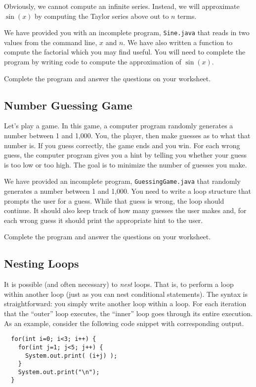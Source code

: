 \documentclass[12pt]{scrartcl}
\begin{document}
Obviously, we cannot compute an infinite series.  Instead, we will 
approximate $\sin(x)$ by computing the Taylor series above out to $n$ 
terms.

We have provided you with an incomplete program, \texttt{Sine.java} 
that reads in two values from the command line, $x$ and $n$.  We have also 
written a function to compute the factorial which you may find useful.  
You will need to complete the program by writing code to compute 
the approximation of $\sin(x)$.

Complete the program and answer the questions on your worksheet. 

\subsection{Number Guessing Game}

Let's play a game.  In this game, a computer program randomly 
generates a number between 1 and 1,000.  You, the player, then 
make guesses as to what that number is.  If you guess correctly, 
the game ends and you win.  For each wrong guess, the computer 
program gives you a hint by telling you whether your guess is too 
low or too high.  The goal is to minimize the number of guesses 
you make.

We have provided an incomplete program, \texttt{GuessingGame.java} 
that randomly generates a number between 1 and 1,000.  You 
need to write a loop structure that prompts the user for a guess.  
While that guess is wrong, the loop should continue.  It should 
also keep track of how many guesses the user makes and, for 
each wrong guess it should print the appropriate hint to the user.

Complete the program and answer the questions on your worksheet. 

\subsection{Nesting Loops}

It is possible (and often necessary) to \emph{nest} loops.  That is, to 
perform a loop within another loop (just as you can nest conditional 
statements).  The syntax is straightforward: you simply write another 
loop within a loop.  For each iteration that the ``outer'' loop executes, 
the ``inner'' loop goes through its entire execution.  As an example, 
consider the following code snippet with corresponding output.

\begin{verbatim}
  for(int i=0; i<3; i++) {
    for(int j=1; j<5; j++) {
      System.out.print( (i+j) );
    }
    System.out.print("\n");
  }
\end{verbatim}
\end{document}
